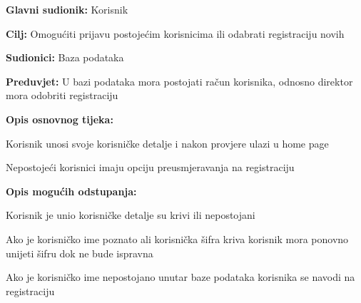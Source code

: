 				\noindent {}
				\begin{packed_item}
					
					\item \textbf{Glavni sudionik:} Korisnik
					\item  \textbf{Cilj:} Omogućiti prijavu postojećim korisnicima ili odabrati registraciju novih
					\item  \textbf{Sudionici:} Baza podataka
					\item  \textbf{Preduvjet:} U bazi podataka mora postojati račun korisnika, odnosno direktor mora odobriti registraciju
					\item  \textbf{Opis osnovnog tijeka:}
					
					\item[] \begin{packed_enum}
						
						\item Korisnik unosi svoje korisničke detalje i nakon provjere ulazi u home page
						\item Nepostojeći korisnici imaju opciju preusmjeravanja na registraciju

					\end{packed_enum}
						\item  \textbf{Opis mogućih odstupanja:}
						
						\item[] \begin{packed_item}
	
							\item[2.a] Korisnik je unio korisničke detalje su krivi ili nepostojani
							\item[] \begin{packed_enum}
								
								\item Ako je korisničko ime poznato ali korisnička šifra kriva korisnik mora ponovno unijeti šifru dok ne bude ispravna
								\item Ako je korisničko ime nepostojano unutar baze podataka korisnika se navodi na registraciju
							\end{packed_enum}
							
						\end{packed_item}					
				\end{packed_item}

